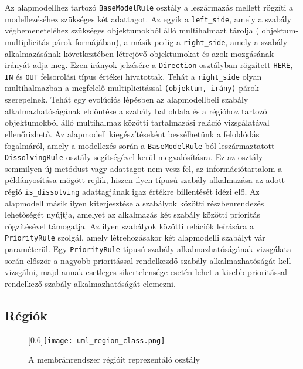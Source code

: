 Az alapmodellhez tartozó \verb|BaseModelRule| osztály a leszármazás mellett rögzíti a modellezéséhez szükséges két adattagot. Az egyik a \verb|left_side|, amely a szabály végbemeneteléhez szükséges objektumokból álló multihalmazt tárolja ( objektum-multiplicitás párok formájában), a másik pedig a \verb|right_side|, amely a szabály alkalmazásának következtében létrejövő objektumokat és azok mozgásának irányát adja meg. Ezen irányok jelzésére a \verb|Direction| osztályban rögzített \verb|HERE|, \verb|IN| és \verb|OUT| felsorolási típus értékei hivatottak. Tehát a \verb|right_side| olyan multihalmazban a megfelelő multiplicitással \verb|(objektum, irány)| párok szerepelnek.
Tehát egy evolúciós lépésben az alapmodellbeli szabály alkalmazhatóságának eldöntése a szabály bal oldala és a régióhoz tartozó objektumokból álló multihalmaz közötti tartalmazási reláció vizsgálatával ellenőrizhető. 
Az alapmodell kiegészítéseként beszélhetünk a feloldódás fogalmáról, amely a modellezés során a \verb|BaseModelRule|-ból leszármaztatott \verb|DissolvingRule| osztály segítségével kerül megvalósításra. Ez az osztály semmilyen új metódust vagy adattagot nem vesz fel, az információtartalom a példányosítása mögött rejlik, hiszen ilyen típusú szabály alkalmazása az adott régió \verb|is_dissolving| adattagjának igaz értékre billentését idézi elő. 
Az alapmodell másik ilyen kiterjesztése a szabályok közötti részbenrendezés lehetőségét nyújtja, amelyet az alkalmazás két szabály közötti prioritás rögzítésével támogatja. Az ilyen szabályok közötti relációk leírására a \verb|PriorityRule| szolgál, amely létrehozásakor két alapmodelli szabályt vár paraméterül.
Egy \verb|PriorityRule| típusú szabály alkalmazhatóságának vizsgálata során először a nagyobb prioritással rendelkezdő szabály alkalmazhatóságát kell vizsgálni, majd annak esetleges  sikertelensége esetén lehet a kisebb prioritással rendelkező szabály alkalmazhatóságát elemezni.


\subsection{Régiók}

\begin{figure}[H]
\centering
	\scalebox{0.6}[0.6]{\texttt{[image: uml\_region\_class.png]}}
	\caption{A membránrendszer régióit reprezentáló osztály}
	\label{fig:region_uml}
\end{figure}

